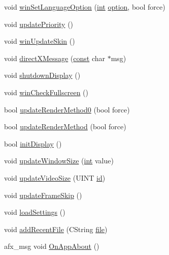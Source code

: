 \begin{DoxyCompactItemize}
\item 
void \mbox{\hyperlink{class_v_b_a_ae872998a3ecf3ec0d504378744f441e6}{win\+Set\+Language\+Option}} (\mbox{\hyperlink{_util_8cpp_a0ef32aa8672df19503a49fab2d0c8071}{int}} \mbox{\hyperlink{structoption}{option}}, bool force)
\item 
void \mbox{\hyperlink{class_v_b_a_a82623f5ce8199b90e3a68fe8c8fee853}{update\+Priority}} ()
\item 
void \mbox{\hyperlink{class_v_b_a_a4648998e25679df69b15afdccb428b8f}{win\+Update\+Skin}} ()
\item 
void \mbox{\hyperlink{class_v_b_a_acb1288f72a2122817f05df2da91a67d2}{direct\+X\+Message}} (\mbox{\hyperlink{getopt1_8c_a2c212835823e3c54a8ab6d95c652660e}{const}} char $\ast$msg)
\item 
void \mbox{\hyperlink{class_v_b_a_ac71d70eba3bf4229255b6aeeea9573e5}{shutdown\+Display}} ()
\item 
void \mbox{\hyperlink{class_v_b_a_a340eaeeb7fcfc242f08ac3442d991a96}{win\+Check\+Fullscreen}} ()
\item 
bool \mbox{\hyperlink{class_v_b_a_a0db47ba257f450e098e7079199385b70}{update\+Render\+Method0}} (bool force)
\item 
bool \mbox{\hyperlink{class_v_b_a_a1d5b9c4597d5c565ce4d8ba1e594a89f}{update\+Render\+Method}} (bool force)
\item 
bool \mbox{\hyperlink{class_v_b_a_a641fd39cdf7ab5f8eff2f85f3ecf3260}{init\+Display}} ()
\item 
void \mbox{\hyperlink{class_v_b_a_ac278ece4958310ce2ef8751afbad08f3}{update\+Window\+Size}} (\mbox{\hyperlink{_util_8cpp_a0ef32aa8672df19503a49fab2d0c8071}{int}} value)
\item 
void \mbox{\hyperlink{class_v_b_a_afe121e9ee080eca73146eb339408a148}{update\+Video\+Size}} (U\+I\+NT \mbox{\hyperlink{_commands_8cpp_a7b7a6396b2c82ad46c6d8b2bf141a8dd}{id}})
\item 
void \mbox{\hyperlink{class_v_b_a_a2b3524193d398b041e90907430361ed8}{update\+Frame\+Skip}} ()
\item 
void \mbox{\hyperlink{class_v_b_a_aed48a7db8cc5b65a1e495661f6040915}{load\+Settings}} ()
\item 
void \mbox{\hyperlink{class_v_b_a_a6b68e58bd0ae7a246ca3c1cd66a1c9db}{add\+Recent\+File}} (C\+String \mbox{\hyperlink{expr-lex_8cpp_a702945180aa732857b380a007a7e2a21}{file}})
\item 
afx\+\_\+msg void \mbox{\hyperlink{class_v_b_a_a0b2f996850d439b4c61c5f8ab7f5afb1}{On\+App\+About}} ()
\end{DoxyCompactItemize}
